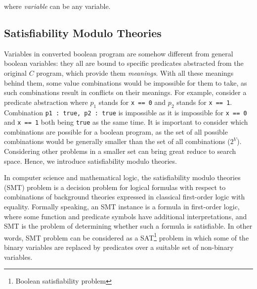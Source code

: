 \documentclass[10pt,journal,final,]{article}
\theoremstyle{definition}
\begin{document}
where \textit{variable} can be any variable.

\subsection{Satisfiability Modulo Theories}
\label{section:SatisifiabilityModuloTheories}
Variables in converted boolean program are somehow different from general boolean variables: they all are bound to specific predicates abstracted from the original $C$ program, which provide them {\it meanings}.
With all these meanings behind them, some value combinations would be impossible for them to take, as such combinations result in conflicts on their meanings.
For example, consider a predicate abstraction where $p_{1}$ stands for \lstinline|x == 0| and $p_{2}$ stands for \lstinline|x == 1|.
Combination \lstinline|p1 : true, p2 : true| is impossible as it is impossible for \lstinline|x == 0| and \lstinline|x == 1| both being \lstinline|true| as the same time.
It is important to consider which combinations are possible for a boolean program, as the set of all possible combinations would be generally smaller than the set of all combinations ($2^{V}$).
Considering other problems in a smaller set can bring great reduce to search space.
Hence, we introduce satisfiability modulo theories.

In computer science and mathematical logic, the satisfiability modulo theories (SMT) problem\cite{SMT} is a decision problem for logical formulas with respect to combinations of background theories expressed in classical first-order logic with equality.
Formally speaking, an SMT instance is a formula in first-order logic, where some function and predicate symbols have additional interpretations, and SMT is the problem of determining whether such a formula is satisfiable.
In other words, SMT problem can be considered as a SAT\footnote{Boolean satisfiability problem} problem in which some of the binary variables are replaced by predicates over a suitable set of non-binary variables\cite{BSAT:SMT}.
\end{document}
